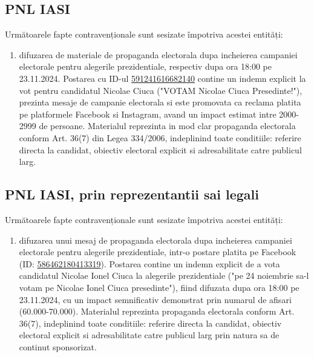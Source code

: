 \documentclass[a4paper,12pt]{article}
\begin{document}
\vspace{0.5cm}

\subsection{PNL IASI}
Următoarele fapte contravenționale sunt sesizate împotriva acestei entități:

\begin{enumerate}[leftmargin=*, label=\arabic*.)]
    \item difuzarea de materiale de propaganda electorala dupa incheierea campaniei electorale pentru alegerile prezidentiale, respectiv dupa ora 18:00 pe 23.11.2024. Postarea cu ID-ul \href{https://www.facebook.com/ads/library/?id=591241616682140}{591241616682140} contine un indemn explicit la vot pentru candidatul Nicolae Ciuca ("VOTAM Nicolae Ciuca Presedinte!"), prezinta mesaje de campanie electorala si este promovata ca reclama platita pe platformele Facebook si Instagram, avand un impact estimat intre 2000-2999 de persoane. Materialul reprezinta in mod clar propaganda electorala conform Art. 36(7) din Legea 334/2006, indeplinind toate conditiile: referire directa la candidat, obiectiv electoral explicit si adresabilitate catre publicul larg.
\end{enumerate}

\vspace{0.5cm}

\subsection{PNL IASI, prin reprezentantii sai legali}
Următoarele fapte contravenționale sunt sesizate împotriva acestei entități:

\begin{enumerate}[leftmargin=*, label=\arabic*.)]
    \item difuzarea unui mesaj de propaganda electorala dupa incheierea campaniei electorale pentru alegerile prezidentiale, intr-o postare platita pe Facebook (ID: \href{https://www.facebook.com/ads/library/?id=586462180413319}{586462180413319}). Postarea contine un indemn explicit de a vota candidatul Nicolae Ionel Ciuca la alegerile prezidentiale ("pe 24 noiembrie sa-l votam pe Nicolae Ionel Ciuca presedinte"), fiind difuzata dupa ora 18:00 pe 23.11.2024, cu un impact semnificativ demonstrat prin numarul de afisari (60.000-70.000). Materialul reprezinta propaganda electorala conform Art. 36(7), indeplinind toate conditiile: referire directa la candidat, obiectiv electoral explicit si adresabilitate catre publicul larg prin natura sa de continut sponsorizat.
\end{enumerate}
\end{document}
